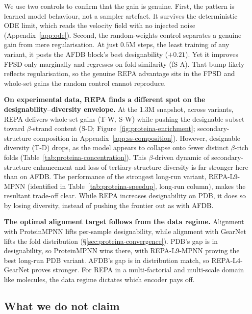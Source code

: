 \documentclass[12pt,a4paper,twoside]{report}
\begin{document}
We use two controls to confirm that the gain is genuine. First, the pattern is learned model behaviour, not a sampler artefact. It survives the deterministic ODE limit, which reads the velocity field with no injected noise (Appendix~\ref{app:ode}). Second, the random-weights control separates a genuine gain from mere regularisation. At just $0.5$M steps, the least training of any variant, it posts the AFDB block's best designability ($+0.21$). Yet it improves FPSD only marginally and regresses on fold similarity (fS-A). That bump likely reflects regularisation, so the genuine REPA advantage sits in the FPSD and whole-set gains the random control cannot reproduce.

\textbf{On experimental data, REPA finds a different spot on the designability--diversity envelope.} At the 1.3M snapshot, across variants, REPA delivers whole-set gains (T-W, S-W) while pushing the designable subset toward $\beta$-strand content (S-D; Figure~\ref{fig:proteina-enrichment}; secondary-structure composition in Appendix~\ref{app:ss-composition}). However, designable diversity (T-D) drops, as the model appears to collapse onto fewer distinct $\beta$-rich folds (Table~\ref{tab:proteina-concentration}). This $\beta$-driven dynamic of secondary-structure enhancement and loss of tertiary-structure diversity is far stronger here than on AFDB. The performance of the strongest long-run variant, REPA-L9-MPNN (identified in Table~\ref{tab:proteina-speedup}, long-run column), makes the resultant trade-off clear. While REPA increases designability on PDB, it does so by losing diversity, instead of pushing the frontier out as with AFDB.





\textbf{The optimal alignment target follows from the data regime.} Alignment with ProteinMPNN lifts per-sample designability, while alignment with GearNet lifts the fold distribution (\S\ref{sec:proteina-convergence}). PDB's gap is in designability, so ProteinMPNN wins there, with REPA-L9-MPNN proving the best long-run PDB variant. AFDB's gap is in distribution match, so REPA-L4-GearNet proves stronger. For REPA in a multi-factorial and multi-scale domain like molecules, the data regime dictates which encoder pays off.

\subsection{What we do not claim}
\label{sec:proteina-scope}
\end{document}
